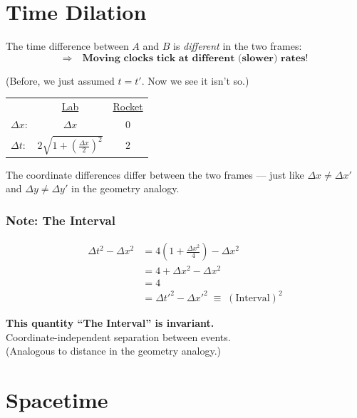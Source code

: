 \section*{Time Dilation}

The time difference between $A$ and $B$ is \emph{different} in the two frames:
\[
  \Rightarrow\quad \textbf{Moving clocks tick at different (slower) rates!}
\]

(Before, we just assumed $t=t'$. Now we see it isn't so.)

\begin{center}
\renewcommand{\arraystretch}{1.4}
\begin{tabular}{lcc}
  & \underline{Lab} & \underline{Rocket} \\
  $\Delta x$: & $\Delta x$ & $0$ \\
  $\Delta t$: & $2\sqrt{1+\!\left(\tfrac{\Delta x}{2}\right)^2}$ & $2$ \\
\end{tabular}
\end{center}

The coordinate differences differ between the two frames —
just like $\Delta x\neq\Delta x'$ and $\Delta y\neq\Delta y'$ in the geometry analogy.

\subsubsection*{Note: The Interval}

\begin{align*}
  \Delta t^2 - \Delta x^2
  &= 4\!\left(1+\frac{\Delta x^2}{4}\right) - \Delta x^2 \\
  &= 4 + \Delta x^2 - \Delta x^2 \\
  &= 4 \\
  &= \Delta t'^2 - \Delta x'^2 \;\equiv\; (\text{Interval})^2
\end{align*}

\begin{tcolorbox}
  \textbf{This quantity ``The Interval'' is invariant.}\\
  Coordinate-independent separation between events.\\
  (Analogous to distance in the geometry analogy.)
\end{tcolorbox}

\section*{Spacetime}


